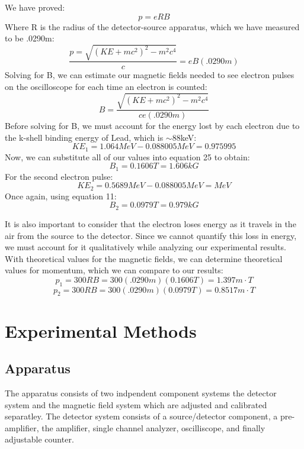 We have proved:
\begin{equation}p=eRB\end{equation}
Where R is the radius of the detector-source apparatus, which we have measured to be .0290m:
\begin{equation}\frac{p=\sqrt{(KE+mc^2)^2-m^2c^4}}{c}=eB(.0290m)\end{equation}
Solving for B, we can estimate our magnetic fields needed to see electron pulses on the oscilloscope for each time an electron is counted:
\begin{equation}B=\frac{\sqrt{(KE+mc^2)^2-m^2c^4}}{ce(.0290m)}\end{equation}
Before solving for B, we must account for the energy lost by each electron due to the k-shell binding energy of Lead, which is $\sim$88keV:
\begin{equation}KE_1=1.064MeV-0.088005MeV=0.975995\end{equation}
Now, we can substitute all of our values into equation 25 to obtain:
\begin{equation} B_1=0.1606T=1.606kG\end{equation}
For the second electron pulse:
\begin{equation}KE_2=0.5689MeV-0.088005MeV=MeV\end{equation}
Once again, using equation 11:
\begin{equation}B_2=0.0979T=0.979kG\end{equation}

It is also important to consider  that the electron loses energy as it travels in the air from the source to the detector. Since we cannot quantify this loss in energy, we must account for it qualitatively while analyzing our  experimental results. With theoretical values for the magnetic fields, we can determine theoretical values for momentum, which we can compare to our results:
\begin{equation}p_1=300RB=300(.0290m)(0.1606T)=1.397 m\cdot T\end{equation}
\begin{equation}p_2=300RB=300(.0290m)(0.0979T)=0.8517 m\cdot T\end{equation}

\section{Experimental Methods}
\subsection{Apparatus}
\indent The apparatus consists of two indpendent component systems the detector system and the magnetic field system which are adjusted and calibrated separatley.  The detector system consists of a source/detector component, a pre-amplifier, the amplifier, single channel analyzer, oscilliscope, and finally adjustable counter.

